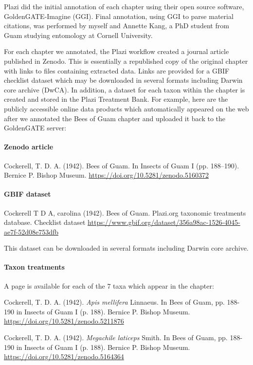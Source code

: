 \documentclass[12pt,letterpaper,english,bibliography=totocnumbered, abstract=on]{scrartcl}
\begin{document}
Plazi did the initial annotation of each chapter using their open source software, GoldenGATE-Imagine (GGI). Final annotation, using GGI to parse material citations, was performed by myself and Annette Kang, a PhD student from Guam studying entomology at Cornell University.

For each chapter we annotated, the Plazi workflow created a journal article published in Zenodo. This is essentially a republished copy of the original chapter with links to files containing extracted data. Links are provided for a GBIF checklist dataset which may be downloaded in several formats including Darwin core archive (DwCA). In addition, a dataset for each taxon within the chapter is created and stored in the Plazi Treatment Bank. For example, here are the publicly accessible online data products which automatically appeared on the web after we annotated the Bees of Guam chapter and uploaded it back to the GoldenGATE server:

\paragraph{Zenodo article} Cockerell, T. D. A. (1942). Bees of Guam. In Insects of Guam I (pp. 188–190). Bernice P. Bishop Museum. \url{https://doi.org/10.5281/zenodo.5160372}

\paragraph{GBIF dataset} Cockerell T D A, carolina (1942). Bees of Guam. Plazi.org taxonomic treatments database. Checklist dataset \url{https://www.gbif.org/dataset/356a98ac-1526-4045-ae7f-52d08e753dfb} 

This dataset can be downloaded in several formats including Darwin core archive.

\paragraph{Taxon treatments} A page is available for each of the 7 taxa which appear in the chapter:

\medskip
Cockerell, T. D. A. (1942). \textit{Apis mellifera} Linnaeus. In Bees of Guam, pp. 188-190 in Insects of Guam I (p. 188). Bernice P. Bishop Museum. \url{https://doi.org/10.5281/zenodo.5211876}

\medskip
Cockerell, T. D. A. (1942). \textit{Megachile laticeps} Smith. In Bees of Guam, pp. 188-190 in Insects of Guam I (p. 188). Bernice P. Bishop Museum. \url{https://doi.org/10.5281/zenodo.5164364}
\end{document}
